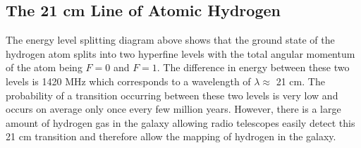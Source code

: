 \documentclass[a4paper]{serif}
\begin{document}
    \subsection{The 21 cm Line of Atomic Hydrogen}
    The energy level splitting diagram above shows that the ground state of
    the hydrogen atom splits into two hyperfine levels with the total angular
    momentum of the atom being $F=0$ and $F=1$.
    The difference in energy between these two levels is 1420 MHz which corresponds
    to a wavelength of $\lambda \approx $ 21 cm. The probability of a transition
    occurring between these two levels is very low and occurs on average only 
    once every few million years. However, there is a large amount of hydrogen gas
    in the galaxy allowing radio telescopes easily detect this 21 cm transition and
    therefore allow the mapping of hydrogen in the galaxy.
\end{document}
